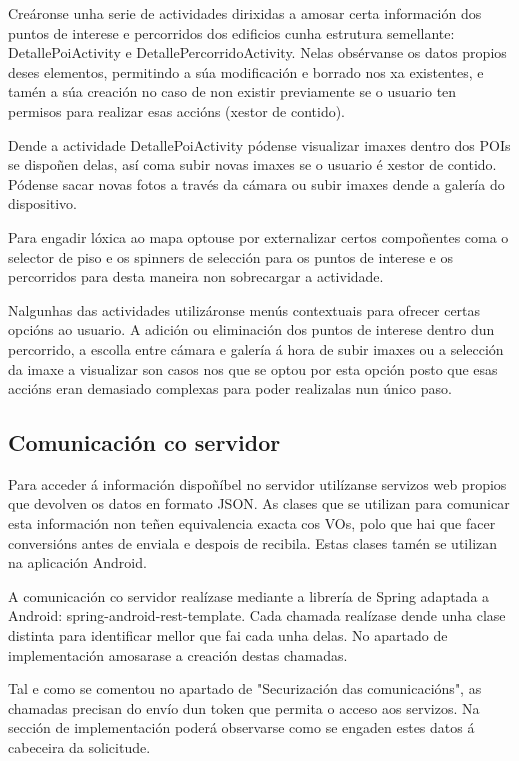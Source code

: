 Creáronse unha serie de actividades dirixidas a amosar certa información dos puntos de interese e percorridos dos edificios cunha estrutura semellante: DetallePoiActivity e DetallePercorridoActivity. Nelas obsérvanse os datos propios deses elementos, permitindo a súa modificación e borrado nos xa existentes, e tamén a súa creación no caso de non existir previamente se o usuario ten permisos para realizar esas accións (xestor de contido).

Dende a actividade DetallePoiActivity pódense visualizar imaxes dentro dos POIs se dispoñen delas, así coma subir novas imaxes se o usuario é xestor de contido. Pódense sacar novas fotos a través da cámara ou subir imaxes dende a galería do dispositivo.

Para engadir lóxica ao mapa optouse por externalizar certos compoñentes coma o selector de piso e os spinners de selección para os puntos de interese e os percorridos para desta maneira non sobrecargar a actividade.

Nalgunhas das actividades utilizáronse menús contextuais para ofrecer certas opcións ao usuario. A adición ou eliminación dos puntos de interese dentro dun percorrido, a escolla entre cámara e galería á hora de subir imaxes ou a selección da imaxe a visualizar son casos nos que se optou por esta opción posto que esas accións eran demasiado complexas para poder realizalas nun único paso.


\subsection{Comunicación co servidor}
Para acceder á información dispoñíbel no servidor utilízanse servizos web propios que devolven os datos en formato JSON. As clases que se utilizan para comunicar esta información non teñen equivalencia exacta cos VOs, polo que hai que facer conversións antes de enviala e despois de recibila. Estas clases tamén se utilizan na aplicación Android.

A comunicación co servidor realízase mediante a librería de Spring adaptada a Android: spring-android-rest-template. Cada chamada realízase dende unha clase distinta para identificar mellor que fai cada unha delas. No apartado de implementación amosarase a creación destas chamadas.

Tal e como se comentou no apartado de "Securización das comunicacións", as chamadas precisan do envío dun token que permita o acceso aos servizos. Na sección de implementación poderá observarse como se engaden estes datos á cabeceira da solicitude.


